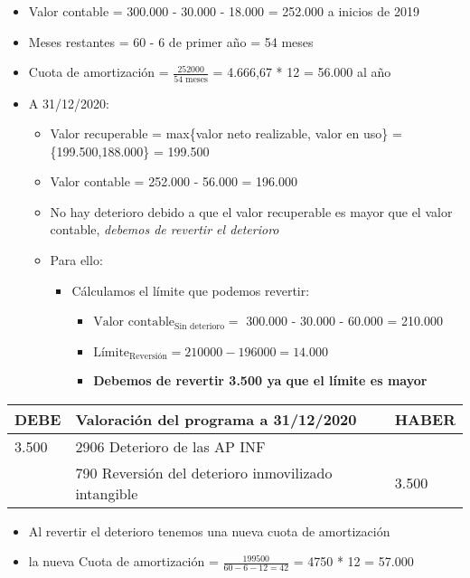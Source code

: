 \documentclass[a4paper,12pt]{article}
\newcommand{\fec}{31/12/}
\newcommand{\valorrecuperable}{Valor recuperable = max\{valor neto realizable, valor en uso\} =}
\newcommand{\VC}{Valor contable = }
\newcommand{\cuotaamort}{Cuota de amortización = }
\newcommand{\myequation}[2]{\ensuremath{\frac{#1}{#2}}}
\newcommand{\negrita}[1]{\textbf{#1}}
\begin{document}
\begin{itemize}
    \item \VC 300.000 - 30.000 - 18.000 = 252.000 a inicios de 2019
    \item Meses restantes = 60 - 6 de primer año = 54 meses
    \item \cuotaamort \myequation{252000}{54 \text{ meses}} = 4.666,67 * 12 = 56.000 al año
    \item A \fec2020:
    \begin{itemize}
        \item \valorrecuperable \{199.500,188.000\} = 199.500
        \item \VC 252.000 - 56.000 = 196.000
        \item No hay deterioro debido a que el valor recuperable es mayor que el valor contable, \textit{debemos de revertir el deterioro}
        \item Para ello:
        \begin{itemize}
            \item Cálculamos el límite que podemos revertir:
            \begin{itemize}
                \item $\text{Valor contable}_{\text{Sin deterioro}} = $ 300.000 - 30.000 - 60.000  = 210.000
                \item $\text{Límite}_{\text{Reversión}} = 210000 - 196000 = 14.000$
                \item \textbf{Debemos de revertir 3.500 ya que el límite es mayor}
            \end{itemize}
        \end{itemize}
    \end{itemize}
\end{itemize}

\begin{table}[H]
    \centering
    \begin{tabular}{|p{3cm}|p{6cm}|p{3cm}|}
    \hline
    \textbf{DEBE} & \textbf{Valoración del programa a \fec2020} & \textbf{HABER} \\
    \hline
    3.500& 2906 Deterioro de las AP INF& \\
    \hline
    & 790 Reversión del deterioro inmovilizado intangible & 3.500\\
    \hline
    \end{tabular}
\end{table}

\begin{itemize}
    \item Al revertir el deterioro tenemos una nueva cuota de amortización 
    \item la nueva \cuotaamort \myequation{199500}{60 - 6 - 12 = 42} = 4750 * 12 = 57.000
\end{itemize}
\end{document}

